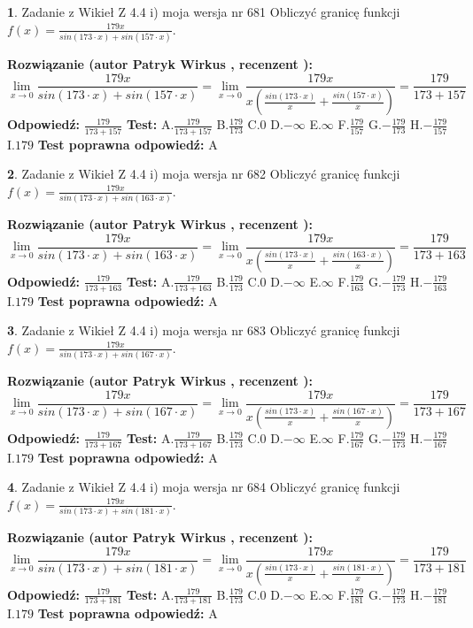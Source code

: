 \documentclass[12pt, a4paper]{article}
\theoremstyle{definition} %
\newtheorem{zad}{}
\newcommand{\zadStart}[1]{\begin{zad}#1\newline}
\newcommand{\zadStop}{\end{zad}}
\newcommand{\rozwStart}[2]{\noindent \textbf{Rozwiązanie (autor #1 , recenzent #2): }\newline}
\newcommand{\rozwStop}{\newline}
\newcommand{\odpStart}{\noindent \textbf{Odpowiedź:}\newline}
\newcommand{\odpStop}{\newline}
\newcommand{\testStart}{\noindent \textbf{Test:}\newline}
\newcommand{\testStop}{\newline}
\newcommand{\kluczStart}{\noindent \textbf{Test poprawna odpowiedź:}\newline}
\newcommand{\kluczStop}{\newline}
\begin{document}
\zadStart{Zadanie z Wikieł Z 4.4 i) moja wersja nr 681}
Obliczyć granicę funkcji $f(x)=\frac{179x}{sin(173\cdot x) +sin(157\cdot x)}$.
\zadStop
\rozwStart{Patryk Wirkus}{}
$$\lim\limits_{x\to 0}\frac{179x}{sin(173\cdot x) +sin(157\cdot x)}=\lim\limits_{x\to 0}\frac{179x}{x(\frac{sin(173\cdot x)}{x}+\frac{sin(157\cdot x)}{x})}=\frac{179}{173+157}$$
\rozwStop
\odpStart
$\frac{179}{173+157}$
\odpStop
\testStart
A.$\frac{179}{173+157}$
B.$\frac{179}{173}$
C.$0$
D.$-\infty$
E.$\infty$
F.$\frac{179}{157}$
G.$-\frac{179}{173}$
H.$-\frac{179}{157}$
I.$179$
\testStop
\kluczStart
A
\kluczStop



\zadStart{Zadanie z Wikieł Z 4.4 i) moja wersja nr 682}
Obliczyć granicę funkcji $f(x)=\frac{179x}{sin(173\cdot x) +sin(163\cdot x)}$.
\zadStop
\rozwStart{Patryk Wirkus}{}
$$\lim\limits_{x\to 0}\frac{179x}{sin(173\cdot x) +sin(163\cdot x)}=\lim\limits_{x\to 0}\frac{179x}{x(\frac{sin(173\cdot x)}{x}+\frac{sin(163\cdot x)}{x})}=\frac{179}{173+163}$$
\rozwStop
\odpStart
$\frac{179}{173+163}$
\odpStop
\testStart
A.$\frac{179}{173+163}$
B.$\frac{179}{173}$
C.$0$
D.$-\infty$
E.$\infty$
F.$\frac{179}{163}$
G.$-\frac{179}{173}$
H.$-\frac{179}{163}$
I.$179$
\testStop
\kluczStart
A
\kluczStop



\zadStart{Zadanie z Wikieł Z 4.4 i) moja wersja nr 683}
Obliczyć granicę funkcji $f(x)=\frac{179x}{sin(173\cdot x) +sin(167\cdot x)}$.
\zadStop
\rozwStart{Patryk Wirkus}{}
$$\lim\limits_{x\to 0}\frac{179x}{sin(173\cdot x) +sin(167\cdot x)}=\lim\limits_{x\to 0}\frac{179x}{x(\frac{sin(173\cdot x)}{x}+\frac{sin(167\cdot x)}{x})}=\frac{179}{173+167}$$
\rozwStop
\odpStart
$\frac{179}{173+167}$
\odpStop
\testStart
A.$\frac{179}{173+167}$
B.$\frac{179}{173}$
C.$0$
D.$-\infty$
E.$\infty$
F.$\frac{179}{167}$
G.$-\frac{179}{173}$
H.$-\frac{179}{167}$
I.$179$
\testStop
\kluczStart
A
\kluczStop



\zadStart{Zadanie z Wikieł Z 4.4 i) moja wersja nr 684}
Obliczyć granicę funkcji $f(x)=\frac{179x}{sin(173\cdot x) +sin(181\cdot x)}$.
\zadStop
\rozwStart{Patryk Wirkus}{}
$$\lim\limits_{x\to 0}\frac{179x}{sin(173\cdot x) +sin(181\cdot x)}=\lim\limits_{x\to 0}\frac{179x}{x(\frac{sin(173\cdot x)}{x}+\frac{sin(181\cdot x)}{x})}=\frac{179}{173+181}$$
\rozwStop
\odpStart
$\frac{179}{173+181}$
\odpStop
\testStart
A.$\frac{179}{173+181}$
B.$\frac{179}{173}$
C.$0$
D.$-\infty$
E.$\infty$
F.$\frac{179}{181}$
G.$-\frac{179}{173}$
H.$-\frac{179}{181}$
I.$179$
\testStop
\kluczStart
A
\kluczStop
\end{document}
